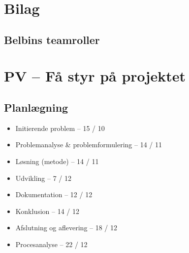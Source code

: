 \documentclass[oneside,a4paper,titlepage]{article}
\begin{document}







\clearpage
\section{Bilag}

\subsection{Belbins teamroller}
\label{sec:styr_paa_projektet}
\section*{PV – Få styr på projektet}
\subsection*{Planlægning}
\begin{itemize}
  \item Initierende problem – 15 / 10
  \item Problemanalyse \& problemformulering – 14 / 11
  \item Løsning (metode) – 14 / 11
  \item Udvikling – 7 / 12
  \item Dokumentation – 12 / 12
  \item Konklusion – 14 / 12
  \item Afslutning og aflevering – 18 / 12
  \item Procesanalyse – 22 / 12
\end{itemize}
\end{document}
